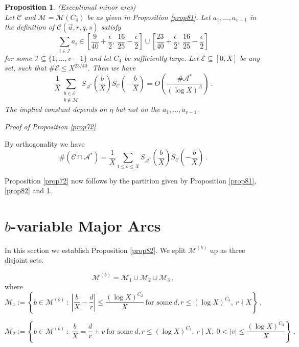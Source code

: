 \documentclass{amsart}
\newtheorem{proposition}[theorem]{Proposition}
\numberwithin{equation}{subsection}
\begin{document}
\begin{proposition}\label{prop83}(Exceptional minor arcs)\\
Let $\mathcal{C}$ and $\mathcal{M}=\mathcal{M}(C_4)$ be as given in Proposition \ref{prop81}. Let $a_1, \ldots, a_{v-1}$ in the definition of $\mathcal{C}(\vec{a}, r, q, s)$ satisfy
$$\sum_{i\in \mathcal{I}} a_i \in \left[  \frac{9}{40}+\frac{\epsilon}{2},\ \frac{16}{25}-\frac{\epsilon}{2} \right] \cup  \left[  \frac{23}{40}+\frac{\epsilon}{2},\ \frac{16}{25}-\frac{\epsilon}{2} \right] $$
for some $\mathcal{I}\subseteq \{1, \ldots, v-1\}$ and let $C_4$ be sufficiently large. Let $\mathcal{E}\subseteq [0, X]$ be any set, such that $\#\mathcal{E}\leq X^{23/40}$. Then we have
$$\frac{1}{X}\sum_{\substack{b\in \mathcal{E} \\ b\not\in \mathcal{M}}} S_{\mathcal{A}^*} \left(\frac{b}{X}\right) S_{\mathcal{C}}\left(-\frac{b}{X}\right)=O\left( \frac{\#\mathcal{A}^*}{(\log X)^A} \right)\:.$$
The implied constant depends on $\eta$ but not on the $a_1, \ldots, a_{v-1}$.
\end{proposition}


\textit{Proof of Proposition \ref{prop72}}

\noindent By orthogonality we have
$$\#(\mathcal{C}\cap \mathcal{A}^*)=\frac{1}{X}\sum_{1\leq b\leq X} S_{\mathcal{A}^*} \left(\frac{b}{X}\right) S_{\mathcal{C}}\left(-\frac{b}{X}\right)\:.$$

Proposition \ref{prop72} now follows by the partition given by Proposition \ref{prop81}, \ref{prop82} and \ref{prop83}.





\section{$b$-variable Major Arcs}

In this section we establish Proposition \ref{prop82}. We split $\mathcal{M}^{(b)}$ up as three disjoint sets.

$$\mathcal{M}^{(b)}= \mathcal{M}_1\cup \mathcal{M}_2 \cup \mathcal{M}_3\:,$$
where
$$\mathcal{M}_1:=\left\{b\in \mathcal{M}^{(b)}\::\: \left|\frac{b}{X}-\frac{d}{r}\right|\leq \frac{(\log X)^{C_2}}{X}\ \text{for some}\ d, r\leq (\log X)^{C_3}, \ r\nmid X \right\}\:,$$

$$\mathcal{M}_2:=\left\{b\in \mathcal{M}^{(b)}\::\: \frac{b}{X}=\frac{d}{r}+v\ \text{for some}\ d, r \leq (\log X)^{C_3},\ r\mid X,\ 0<|v|\leq \frac{(\log X)^{C_3}}{X}\right\} \:,$$
\end{document}
